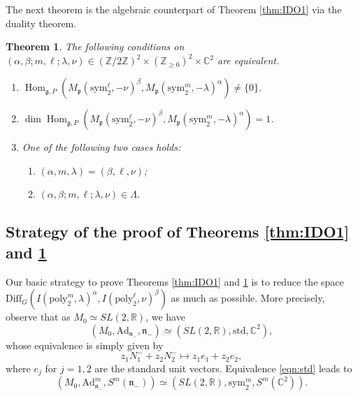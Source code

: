 \documentclass[reqno,11pt]{amsart}
\newtheorem{thm}[equation]{Theorem}
\theoremstyle{remark}
\numberwithin{equation}{section}
\newcommand{\gb}{\beta}
\newcommand{\ga}{\alpha}
\newcommand{\gL}{\Lambda}
\newcommand{\fg}{{\mathfrak g}}
\newcommand{\fn}{{\mathfrak n}}
\newcommand{\fp}{{\mathfrak p}}
\newcommand{\R}{\mathbb{R}}
\newcommand{\C}{\mathbb{C}}
\newcommand{\Z}{\mathbb{Z}}
\newcommand{\Ad}{\mathrm{Ad}}
\newcommand{\Hom}{\operatorname{Hom}}
\newcommand{\poly}{\mathrm{poly}}
\newcommand{\Diff}{\mathrm{Diff}}
\newcommand{\sym}{\mathrm{sym}}
\newcommand{\std}{\mathrm{std}}
\begin{document}
The next theorem is the algebraic counterpart of Theorem \ref{thm:IDO1} via 
the duality theorem.%

\begin{thm}\label{thm:gP1}
The following conditions on 
$(\ga, \gb; m,\ell; \lambda,\nu) \in (\Z/2\Z)^2 \times (\Z_{\geq 0})^2 \times \C^2$ 
are equivalent.
\begin{enumerate}
\item[\emph{(i)}]
$\Hom_{\fg,P}(M_\fp(\sym_2^{\ell},-\nu)^{\gb},
M_\fp(\sym_2^m, -\lambda)^\ga) \neq \{0\}$.

\item[\emph{(ii)}]
$\dim \Hom_{\fg,P}(M_\fp(\sym_2^{\ell},-\nu)^{\gb},
M_\fp(\sym_2^m, -\lambda)^\ga) =1$.

\item[\emph{(iii)}]
One of the following two cases holds:
\begin{enumerate}
\item[\emph{(iii-a)}] $(\ga, m, \lambda) = (\gb, \ell, \nu)$;
\item[\emph{(iii-b)}] $(\ga, \gb; m,\ell; \lambda,\nu) \in \gL$.
\end{enumerate}
\end{enumerate}
\end{thm}

\subsection{Strategy of the proof of Theorems \ref{thm:IDO1} and \ref{thm:gP1}}
\label{sec:proof1}
Our basic strategy to prove Theorems \ref{thm:IDO1} and \ref{thm:gP1} is to reduce 
the space $\Diff_G(I(\poly_2^m, \lambda)^\ga, I(\poly_2^\ell,  \nu)^\beta)$
as much as possible. More precisely, observe that 
as $M_0 \simeq SL(2,\R)$, we have  
\begin{equation}\label{eqn:std}
(M_0, \Ad_{\fn_-}, \fn_-)
\simeq
(SL(2,\R), \std, \C^2),
\end{equation}
whose equivalence is simply given by
\begin{equation*}
z_1 N_1^-+ z_2 N_2^- \mapsto z_1 e_1 + z_2 e_2,
\end{equation*}
where $e_j$ for $j=1,2$ are the standard unit vectors.
Equivalence \eqref{eqn:std} leads to
\begin{equation*}
(M_0, \Ad^m_{\fn_-}, S^m(\fn_-))
\simeq
(SL(2,\R), \sym_2^m, S^m(\C^2)).
\end{equation*}
\end{document}

